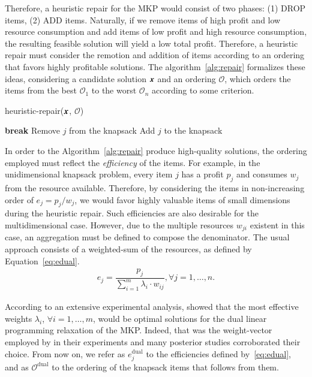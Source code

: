 \documentclass[3p,authoryear]{elsarticle}
\newcommand{\Ord}{\mathcal{O}}
\begin{document}
Therefore, a heuristic repair for the \gls{MKP} would consist of two phases: (1) DROP items, (2) ADD items. Naturally, if we remove items of high profit and low resource consumption and add items of low profit and high resource consumption, the resulting feasible solution will yield a low total profit. Therefore, a heuristic repair must consider the remotion and addition of items according to an ordering that favors highly profitable solutions. The algorithm~\ref{alg:repair} formalizes these ideas, considering a candidate solution $\boldsymbol{x}$ and an ordering $\Ord$, which orders the items from the best $\Ord_1$ to the worst $\Ord_n$ according to some criterion.
\begin{algorithm}
	\caption{ {\sc heuristic-repair($\boldsymbol{x}$, $\Ord$)}}
	\label{alg:repair}
	\begin{algorithmic}[1]
		\ForAll {$j= \Ord_n,\dots,\Ord_1$} 
			 {\textbf{break}}
			\State Remove $j$ from the knapsack%
		\EndFor
		\ForAll {$j= \Ord_1,\dots,\Ord_n$} 
			   	\State Add $j$ to the knapsack%
			   \EndIf
		\EndFor						
	\end{algorithmic}
\end{algorithm}

In order to the Algorithm~\ref{alg:repair} produce high-quality solutions, the ordering employed must reflect the \textit{efficiency} of the items. For example, in the unidimensional knapsack problem, every item $j$ has a profit $p_j$ and consumes $w_j$ from the resource available. Therefore, by considering the items in non-increasing order of $e_j=p_j/w_j$, we would favor highly valuable items of small dimensions during the heuristic repair. Such efficiencies are also desirable for the multidimensional case. However, due to the multiple resources $w_{ji}$ existent in this case, an aggregation must be defined to compose the denominator. The usual approach consists of a weighted-sum of the resources, as defined by Equation~\eqref{eq:edual}.
\begin{align}
e_j=\dfrac{p_j}{\sum_{i=1}^m \lambda_i \cdot w_{ij}},\forall j=1,\dots,n.\label{eq:edual}
\end{align}


According to an extensive experimental analysis, \cite{puchinger2010mkp} showed that the most effective weights $\lambda_i$, $\forall i=1,\dots,m$, would be optimal solutions for the dual linear programming relaxation of the \gls{MKP}. Indeed, that was the weight-vector employed by \cite{chu1998} in their experiments and many posterior studies corroborated their choice. From now on, we refer as $e_j^\text{dual}$ to the efficiencies defined by~\eqref{eq:edual}, and as $\Ord^\text{dual}$ to the ordering of the knapsack items that follows from them.
\end{document}
